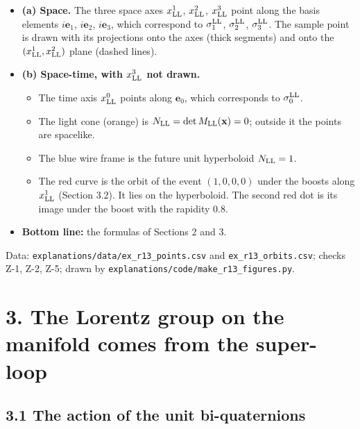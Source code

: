 \documentclass[
  10pt,
]{article}
\providecommand{\tightlist}{%
  \setlength{\itemsep}{0pt}\setlength{\parskip}{0pt}}
\begin{document}
\begin{itemize}
\tightlist
\item
  \textbf{(a) Space.} The three space axes \(x^1_{\rm LL}\),
  \(x^2_{\rm LL}\), \(x^3_{\rm LL}\) point along the basis elements
  \(i\mathbf e_1\), \(i\mathbf e_2\), \(i\mathbf e_3\), which correspond
  to \(\sigma^{\rm LL}_1\), \(\sigma^{\rm LL}_2\),
  \(\sigma^{\rm LL}_3\). The sample point is drawn with its projections
  onto the axes (thick segments) and onto the
  \((x^1_{\rm LL},x^2_{\rm LL})\) plane (dashed lines).
\item
  \textbf{(b) Space-time, with \(x^3_{\rm LL}\) not drawn.}

  \begin{itemize}
  \tightlist
  \item
    The time axis \(x^0_{\rm LL}\) points along \(\mathbf e_0\), which
    corresponds to \(\sigma^{\rm LL}_0\).
  \item
    The light cone (orange) is
    \(N_{\rm LL}=\det M_{\rm LL}(\mathbf x)=0\); outside it the points
    are spacelike.
  \item
    The blue wire frame is the future unit hyperboloid \(N_{\rm LL}=1\).
  \item
    The red curve is the orbit of the event \((1,0,0,0)\) under the
    boosts along \(x^1_{\rm LL}\) (Section 3.2). It lies on the
    hyperboloid. The second red dot is its image under the boost with
    the rapidity 0.8.
  \end{itemize}
\item
  \textbf{Bottom line:} the formulas of Sections 2 and 3.
\end{itemize}

Data: \texttt{explanations/data/ex\_r13\_points.csv} and
\texttt{ex\_r13\_orbits.csv}; checks Z-1, Z-2, Z-5; drawn by
\texttt{explanations/code/make\_r13\_figures.py}.

\hypertarget{the-lorentz-group-on-the-manifold-comes-from-the-super-loop}{%
\section{3. The Lorentz group on the manifold comes from the
super-loop}\label{the-lorentz-group-on-the-manifold-comes-from-the-super-loop}}

\hypertarget{the-action-of-the-unit-bi-quaternions}{%
\subsection{3.1 The action of the unit
bi-quaternions}\label{the-action-of-the-unit-bi-quaternions}}
\end{document}
